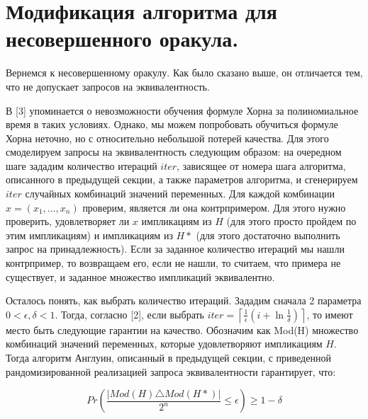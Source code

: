 \section{Модификация алгоритма для несовершенного оракула.}

Вернемся к несовершенному оракулу. Как было сказано выше, он отличается тем, что не допускает запросов на эквивалентность.

В [3] упоминается о невозможности обучения формуле Хорна за полиномиальное время в таких условиях. Однако, мы можем попробовать обучиться формуле Хорна неточно, но с относительно небольшой потерей качества. Для этого смоделируем запросы на эквивалентность следующим образом: на очередном шаге зададим количество итераций $iter$, зависящее от номера шага алгоритма, описанного в предыдущей секции, а также параметров алгоритма, и сгенерируем $iter$ случайных комбинаций значений переменных. Для каждой комбинации $x = (x_1, \dots, x_n)$ проверим, является ли она контрпримером. Для этого нужно проверить, удовлетворяет ли $x$ импликациям из $H$ (для этого просто пройдем по этим импликациям) и импликациям из $H*$ (для этого достаточно выполнить запрос на принадлежность). Если за заданное количество итераций мы нашли контрпример, то возвращаем его, если не нашли, то считаем, что примера не существует, и заданное множество импликаций эквивалентно.

Осталось понять, как выбрать количество итераций. Зададим сначала 2 параметра $0 < \epsilon, \delta < 1$. Тогда, согласно [2], если выбрать $iter = \left\lceil \frac{1}{\epsilon}\left(i + \ln \frac{1}{\delta}\right) \right\rceil$, то имеют место быть следующие гарантии на качество. Обозначим как Mod(H) множество комбинаций значений переменных, которые удовлетворяют импликациям $H$. Тогда алгоритм Англуин, описанный в предыдущей секции, с приведенной рандомизированной реализацией запроса эквивалентности гарантирует, что:

\begin{equation}
	Pr\left(\frac{\left| Mod(H) \triangle Mod(H*) \right|}{2^n} \leq \epsilon \right) \geq 1 - \delta
\end{equation}